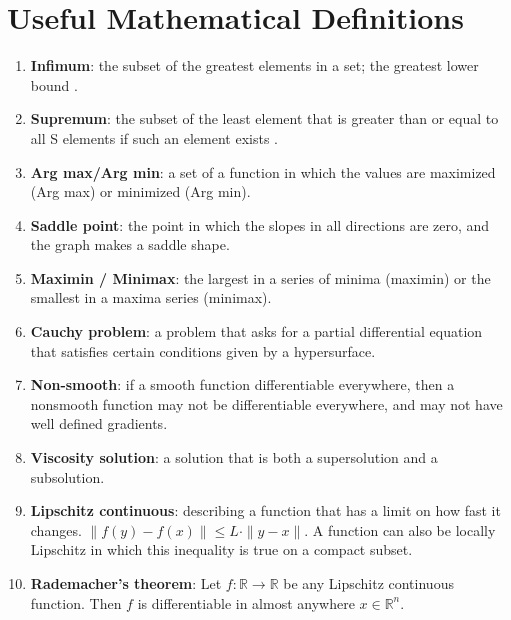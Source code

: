 \documentclass[11pt]{amsart}
\begin{document}
\section{Useful Mathematical Definitions}\label{mathdefs}
\begin{enumerate}
    \item\label{math:infimum} \textbf{Infimum}: the subset of the greatest elements in a set; the greatest lower bound \cite{infimumsupremum}.
    \item\label{math:supremum} \textbf{Supremum}: the subset of the least element that is greater than or equal to all S elements if such an element exists  \cite{infimumsupremum}.
    \item\label{math:Argmaxmin} \textbf{Arg max/Arg min}: a set of a function in which the values are maximized (Arg max) or minimized (Arg min).
    \item\label{math:saddlepoint} \textbf{Saddle point}: the point in which the slopes in all directions are zero, and the graph makes a saddle shape.
    \item\label{math:maximinminimax} \textbf{Maximin / Minimax}: the largest in a series of minima (maximin) or the smallest in a maxima series (minimax).
    \item\label{math:cauchyproblem} \textbf{Cauchy problem}: a problem that asks for a partial differential equation that satisfies certain conditions given by a hypersurface.
    \item\label{math:nonsmooth} \textbf{Non-smooth}: if a smooth function differentiable everywhere, then a nonsmooth function may not be differentiable everywhere, and may not have well defined gradients. 
    \item\label{math:viscosity} \textbf{Viscosity solution}: a solution that is both a supersolution and a subsolution.
    \item\label{math:lipschitz} \textbf{Lipschitz continuous}: describing a function that has a limit on how fast it changes. $\|f(y)-f(x)\| \leq L \cdot \|y-x\|$. A function can also be locally Lipschitz in which this inequality is true on a compact subset.
    \item\label{math:rademacher} \textbf{Rademacher's theorem}: Let $f: \mathbb{R} \rightarrow \mathbb{R} $ be any Lipschitz continuous function. Then $f$ is differentiable in almost anywhere $x \in \mathbb{R}^n$.

\end{enumerate}
\end{document}

